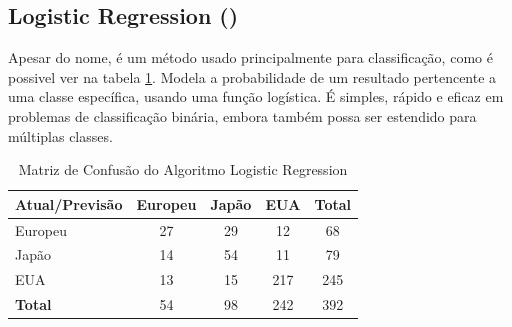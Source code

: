 \documentclass[conference]{IEEEtran}
\begin{document}
\subsection{Logistic Regression (\cite{regression})}
Apesar do nome, é um método usado principalmente para classificação, como é possivel ver na tabela \ref{tab:conf_matrix_logistic}.
Modela a probabilidade de um resultado pertencente a uma classe específica, usando uma função logística. É simples, rápido e eficaz
em problemas de classificação binária, embora também possa ser estendido para múltiplas classes.
\begin{table}[!ht]
	\centering
	\begin{tabular}{lcccc}
		\toprule
		\textbf{Atual/Previsão} & \textbf{Europeu} & \textbf{Japão} & \textbf{EUA} & \textbf{Total} \\
		\midrule
		Europeu                 & 27               & 29             & 12           & 68             \\
		Japão                   & 14               & 54             & 11           & 79             \\
		EUA                     & 13               & 15             & 217          & 245            \\
		\midrule
		\textbf{Total}          & 54               & 98             & 242          & 392            \\
		\bottomrule
	\end{tabular}
	\caption{Matriz de Confusão do Algoritmo Logistic Regression}
	\label{tab:conf_matrix_logistic}

\end{table}

\end{document}
